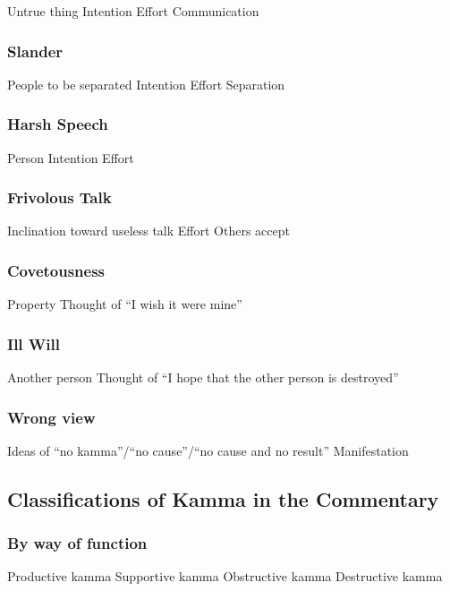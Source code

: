 \documentclass[a4 paper, 12pt]{article}
\begin{document}
 Untrue thing  Intention  Effort  Communication

\subsubsection*{Slander}

 People to be separated  Intention  Effort  Separation

\subsubsection*{Harsh Speech}

 Person  Intention  Effort

\subsubsection*{Frivolous Talk}

 Inclination toward useless talk  Effort  Others accept 

\subsubsection*{Covetousness}

 Property  Thought of “I wish it were mine”

\subsubsection*{Ill Will}

 Another person  Thought of “I hope that the other person is destroyed”

\subsubsection*{Wrong view}

 Ideas of “no kamma”/“no cause”/“no cause and no result”  Manifestation

\newpage

\subsection*{Classifications of Kamma in the Commentary}

\subsubsection*{By way of function}
 Productive kamma  Supportive kamma  Obstructive kamma  Destructive kamma
\end{document}
